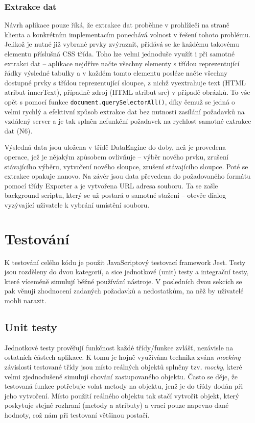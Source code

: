 \documentclass[thesis=B,czech]{FITthesis}[2012/06/26]
\begin{document}
\subsection{Extrakce dat}
Návrh aplikace pouze říká, že extrakce dat proběhne v prohlížeči na straně klienta a konkrétním implementacím ponechává volnost v řešení tohoto problému. Jelikož je nutné již vybrané prvky zvýraznit, přidává se ke každému takovému elementu příslušná CSS třída. Toho lze velmi jednoduše využít i při samotné extrakci dat -- aplikace nejdříve načte všechny elementy s třídou reprezentující řádky výsledné tabulky a v každém tomto elementu posléze načte všechny dostupné prvky s třídou reprezentující sloupce, z nichž vyextrahuje text (HTML atribut \textsf{innerText}), případně zdroj (HTML atribut \textsf{src}) v případě obrázků. To vše opět s pomocí funkce \verb|document.querySelectorAll()|, díky čemuž se jedná o velmi rychlý a efektivní způsob extrakce dat bez nutnosti zasílání požadavků na vzdálený server a je tak splněn nefunkční požadavek na rychlost samotné extrakce dat (N6).

Výsledná data jsou uložena v třídě DataEngine do doby, než je provedena operace, jež je nějakým způsobem ovlivňuje -- výběr nového prvku, zrušení stávajícího výběru, vytvoření nového sloupce, zrušení stávajícího sloupce. Poté se extrakce opakuje nanovo.
\clearpage
Na závěr jsou data převedena do požadovaného formátu pomocí třídy Exporter a je vytvořena URL adresa souboru. Ta se zašle background scriptu, který se už postará o samotné stažení -- otevře dialog vyzývající uživatele k vybrání umístění souboru.


\chapter{Testování}
K testování celého kódu je použit JavaScriptový testovací framework Jest. Testy jsou rozděleny do dvou kategorií, a sice jednotkové (unit) testy a integrační testy, které víceméně simulují běžné používání nástroje. V posledních dvou sekcích se pak věnuji zhodnocení zadaných požadavků a nedostatkům, na něž by uživatelé mohli narazit.


\section{Unit testy}
Jednotkové testy prověřují funkčnost každé třídy/funkce zvlášť, nezávisle na ostatních částech aplikace. K tomu je hojně využívána technika zvána \emph{mocking} -- závislosti testované třídy jsou místo reálných objektů splněny tzv. \emph{mocky}, které velmi zjednodušeně simulují chování zastupovaného objektu. Často se děje, že testovaná funkce potřebuje volat metody na objektu, jenž je do třídy dodán při jeho vytvoření. Místo použití reálného objektu tak stačí vytvořit objekt, který poskytuje stejné rozhraní (metody a atributy) a vrací pouze napevno dané hodnoty, což nám při testovaní většinou postačí.
\end{document}
